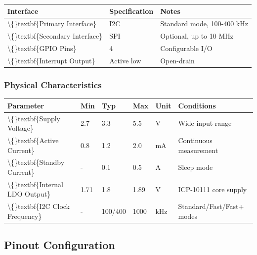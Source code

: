 \documentclass[11pt,a4paper]{article}
\begin{document}
\begin{table}[H]
\centering
\begin{tabular}{lll}
\toprule
Interface & Specification & Notes \\
\midrule
\textbackslash\{\}textbf\{Primary Interface\} & I2C & Standard mode, 100-400 kHz \\
\textbackslash\{\}textbf\{Secondary Interface\} & SPI & Optional, up to 10 MHz \\
\textbackslash\{\}textbf\{GPIO Pins\} & 4 & Configurable I/O \\
\textbackslash\{\}textbf\{Interrupt Output\} & Active low & Open-drain \\
\bottomrule
\end{tabular}
\end{table}


\subsubsection{Physical Characteristics}

\begin{table}[H]
\centering
\begin{tabular}{llllll}
\toprule
Parameter & Min & Typ & Max & Unit & Conditions \\
\midrule
\textbackslash\{\}textbf\{Supply Voltage\} & 2.7 & 3.3 & 5.5 & V & Wide input range \\
\textbackslash\{\}textbf\{Active Current\} & 0.8 & 1.2 & 2.0 & mA & Continuous measurement \\
\textbackslash\{\}textbf\{Standby Current\} & - & 0.1 & 0.5 & \textmu{}A & Sleep mode \\
\textbackslash\{\}textbf\{Internal LDO Output\} & 1.71 & 1.8 & 1.89 & V & ICP-10111 core supply \\
\textbackslash\{\}textbf\{I2C Clock Frequency\} & - & 100/400 & 1000 & kHz & Standard/Fast/Fast+ modes \\
\bottomrule
\end{tabular}
\end{table}


\subsection{Pinout Configuration}
\end{document}

